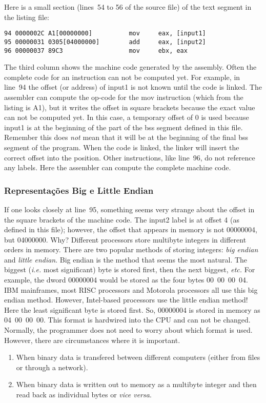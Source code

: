{Here is a small section (lines~54 to 56 of the source file) of the
text segment in the listing file:
\begin{Verbatim}[xleftmargin=\AsmMargin]
94 0000002C A1[00000000]          mov     eax, [input1]
95 00000031 0305[04000000]        add     eax, [input2]
96 00000037 89C3                  mov     ebx, eax
\end{Verbatim}
The third column shows the machine code generated by the
assembly. Often the complete code for an instruction can not be
computed yet. For example, in line~94 the offset (or address) of
{\code input1} is not known until the code is linked. The assembler
can compute the op-code for the {\code mov} instruction (which from
the listing is A1), but it writes the offset in square brackets
because the exact value can not be computed yet. In this case, a
temporary offset of 0 is used because {\code input1} is at the
beginning of the part of the bss segment defined in this
file. Remember this does \emph{not} mean that it will be at the
beginning of the final bss segment of the program. When the code is linked,
the linker will insert the correct offset into the position. Other
instructions, like line~96, do not reference any labels. Here the assembler
can compute the complete machine code.

\subsubsection{Representações Big e Little Endian }
If one looks closely at line~95, something seems very strange about
the offset in the square brackets of the machine code. The {\code
input2} label is at offset 4 (as defined in this file); however, the
offset that appears in memory is not 00000004, but 04000000. Why? Different
processors store multibyte integers in different orders in
memory. There are two popular methods of storing integers: \emph{big
endian} and \emph{little endian}.  Big endian is the method that seems the most
natural. The biggest (\emph{i.e.} most significant) byte is stored
first, then the next biggest, \emph{etc.} For example, the dword
00000004 would be stored as the four bytes 00~00~00~04.  IBM
mainframes, most RISC processors and Motorola processors all use this
big endian method. However, Intel-based processors use the little
endian method! Here the least significant byte is stored first. So,
00000004 is stored in memory as 04~00~00~00. This format is hardwired
into the CPU and can not be changed. Normally, the programmer does not
need to worry about which format is used. However, there are
circumstances where it is important.
\begin{enumerate}
\item When binary data is transfered between different computers (either from
      files or through a network).
\item When binary data is written out to memory as a multibyte integer and
      then read back as individual bytes or \emph{vice versa}.
\end{enumerate}

}
